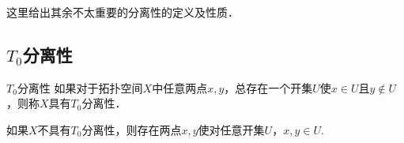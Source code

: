 
\begin{issues}
\issueDraft
\end{issues}

这里给出其余不太重要的分离性的定义及性质．

\subsection{$T_0$分离性}
\begin{definition}{$T_0$分离性}
如果对于拓扑空间$X$中任意两点$x,y$，总存在一个开集$U$使$x\in U$且$y\notin U$，则称$X$具有$T_0$分离性．
\end{definition}

如果$X$不具有$T_0$分离性，则存在两点$x,y$使对任意开集$U$，$x,y\in U$.


